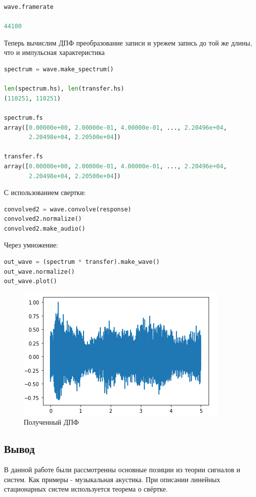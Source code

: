 \begin{lstlisting}[language=Python]
wave.framerate

44100
\end{lstlisting}

Теперь вычислим ДПФ преобразование записи и урежем запись до той же длины, что и импульсная характеристика

\begin{lstlisting}[language=Python]
spectrum = wave.make_spectrum()

len(spectrum.hs), len(transfer.hs)
(110251, 110251)

spectrum.fs
array([0.00000e+00, 2.00000e-01, 4.00000e-01, ..., 2.20496e+04,
       2.20498e+04, 2.20500e+04])

transfer.fs
array([0.00000e+00, 2.00000e-01, 4.00000e-01, ..., 2.20496e+04,
       2.20498e+04, 2.20500e+04])
\end{lstlisting}

С использованием свертки:

\begin{lstlisting}[language=Python]
convolved2 = wave.convolve(response)
convolved2.normalize()
convolved2.make_audio()
\end{lstlisting}

Через умножение:

\begin{lstlisting}[language=Python]
out_wave = (spectrum * transfer).make_wave()
out_wave.normalize()
out_wave.plot()
\end{lstlisting}

\begin{figure}[H]
	\begin{center}
		\includegraphics[scale=1]{fig/lab10/lab10_09.png}
		\caption{Полученный ДПФ} 
	\end{center}
\end{figure}


\subsection{Вывод}

В данной работе были рассмотренны основные позиции из теории сигналов и систем. Как примеры - музыкальная акустика. При описании линейных стационарных систем используется теорема о свёртке.